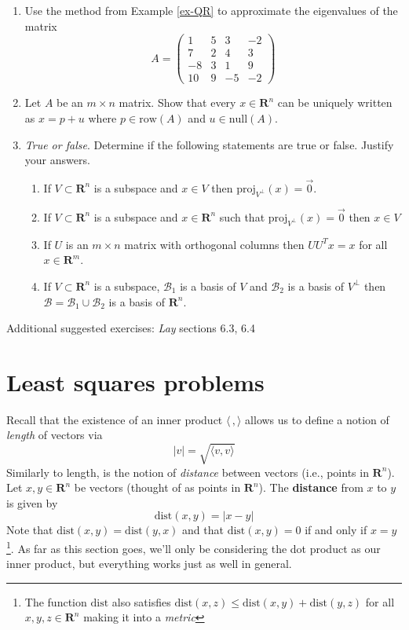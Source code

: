 \documentclass[12pt]{article}
\numberwithin{equation}{subsection}
\numberwithin{figure}{subsection}
\theoremstyle{note}
\newcommand{\R}{\mathbf{R}}
\newcommand\nul[1]{\mathrm{null}(#1)}
\newcommand\row[1]{\mathrm{row}(#1)}
\newcommand\ip[2]{\langle #1, #2\rangle}
\newcommand\proj[2]{\mathrm{proj}_{#1}(#2)}
\begin{document}
\begin{enumerate}[label=\arabic*.]
\item Use the method from Example \ref{ex-QR} to approximate the eigenvalues of the matrix
\[ A=\begin{pmatrix} 1 & 5 & 3 & -2 \\ 7 & 2 & 4 & 3 \\ -8 & 3 & 1 & 9 \\ 10 & 9 & -5 & -2\end{pmatrix}\] 
\item Let $A$ be an $m\times n$ matrix. Show that every $x\in \R^n$ can be uniquely written as $x=p+u$ where $p\in \row{A}$ and $u\in \nul{A}$.

\item \textit{True or false}. Determine if the following statements are true or false. Justify your answers.
\begin{enumerate}
	\item If $V\subset \R^n$ is a subspace and $x\in V$ then $\proj{V^{\perp}}{x}=\vec{0}$.
	\item If $V\subset \R^n$ is a subspace and $x\in\R^n$ such that  $\proj{V^{\perp}}{x}=\vec{0}$ then $x\in V$
	\item If $U$ is an $m\times n$ matrix with orthogonal columns then $UU^Tx=x$ for all $x\in \R^m$. 
	\item If $V\subset \R^n$ is a subspace, $\mathcal{B}_1$ is a basis of $V$ and $\mathcal{B}_2$ is a basis of $V^{\perp}$ then $\mathcal{B}=\mathcal{B}_1\cup \mathcal{B}_2$ is a basis of $\R^n$.

\end{enumerate}
\end{enumerate}
Additional suggested exercises: \textit{Lay} sections 6.3, 6.4




\section{Least squares problems}
\label{sec-LS}



Recall that the existence of an inner product $\ip{\,}{}$ allows us to define a notion of \textit{length} of vectors via \begin{equation} |v|=\sqrt{\ip{v}{v}}\end{equation} Similarly to length, is the notion of \textit{distance} between vectors (i.e., points in $\R^n$). Let $x,y\in \R^n$ be vectors (thought of as points in $\R^n$). The \textbf{distance} from $x$ to $y$ is given by \begin{equation} \mathrm{dist}(x,y)=|x-y|\end{equation}
Note that $\mathrm{dist}(x,y)=\mathrm{dist}(y,x)$ and that $\mathrm{dist}(x,y)=0$ if and only if $x=y$\footnote{The function $\mathrm{dist}$ also satisfies $\mathrm{dist}(x,z)\leq \mathrm{dist}(x,y)+\mathrm{dist}(y,z)$ for all $x,y,z\in \R^n$ making it into a \textit{metric}}. As far as this section goes, we'll only be considering the dot product as our inner product, but everything works just as well in general. 
\end{document}
